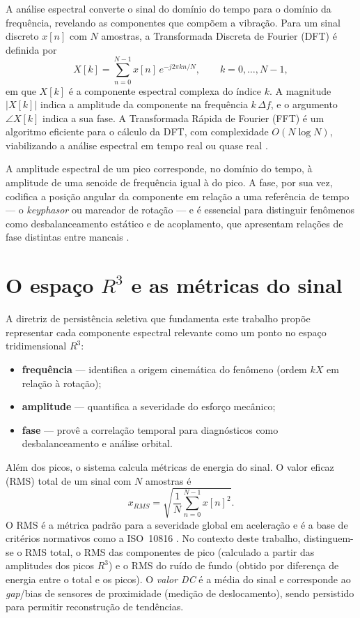 A análise espectral converte o sinal do domínio do tempo para o domínio da
frequência, revelando as componentes que compõem a vibração. Para um sinal
discreto \(x[n]\) com \(N\) amostras, a Transformada Discreta de Fourier (DFT)
é definida por
\begin{equation}
\label{eq:dft}
  X[k] = \sum_{n=0}^{N-1} x[n]\, e^{-j 2\pi k n / N}, \qquad k = 0,\ldots,N-1,
\end{equation}
em que \(X[k]\) é a componente espectral complexa do índice \(k\). A magnitude
\(|X[k]|\) indica a amplitude da componente na frequência \(k\,\Delta f\), e o
argumento \(\angle X[k]\) indica a sua fase. A Transformada Rápida de Fourier
(FFT) é um algoritmo eficiente para o cálculo da DFT, com complexidade
\(O(N \log N)\), viabilizando a análise espectral em tempo real ou quase real
\cite{cooley1965,oppenheim2010}.

A amplitude espectral de um pico corresponde, no domínio do tempo, à amplitude
de uma senoide de frequência igual à do pico. A fase, por sua vez, codifica a
posição angular da componente em relação a uma referência de tempo --- o
\emph{keyphasor} ou marcador de rotação --- e é essencial para distinguir
fenômenos como desbalanceamento estático e de acoplamento, que apresentam
relações de fase distintas entre mancais \cite{randall2011,harris2002}.

\section{O espaço \(R^3\) e as métricas do sinal}
\label{sec:r3}

A diretriz de persistência seletiva que fundamenta este trabalho propõe
representar cada componente espectral relevante como um ponto no espaço
tridimensional \(R^3\):
\begin{itemize}
  \item \textbf{frequência} --- identifica a origem cinemática do fenômeno
  (ordem \(kX\) em relação à rotação);
  \item \textbf{amplitude} --- quantifica a severidade do esforço mecânico;
  \item \textbf{fase} --- provê a correlação temporal para diagnósticos como
  desbalanceamento e análise orbital.
\end{itemize}

Além dos picos, o sistema calcula métricas de energia do sinal. O valor eficaz
(RMS) total de um sinal com \(N\) amostras é
\begin{equation}
\label{eq:rms}
  x_{RMS} = \sqrt{\frac{1}{N}\sum_{n=0}^{N-1} x[n]^2}.
\end{equation}
O RMS é a métrica padrão para a severidade global em aceleração e é a base de
critérios normativos como a ISO~10816 \cite{iso10816}. No contexto deste
trabalho, distinguem-se o RMS total, o RMS das componentes de pico (calculado a
partir das amplitudes dos picos \(R^3\)) e o RMS do ruído de fundo (obtido por
diferença de energia entre o total e os picos). O \emph{valor DC} é a média do
sinal e corresponde ao \emph{gap}/bias de sensores de proximidade (medição de
deslocamento), sendo persistido para permitir reconstrução de tendências.

